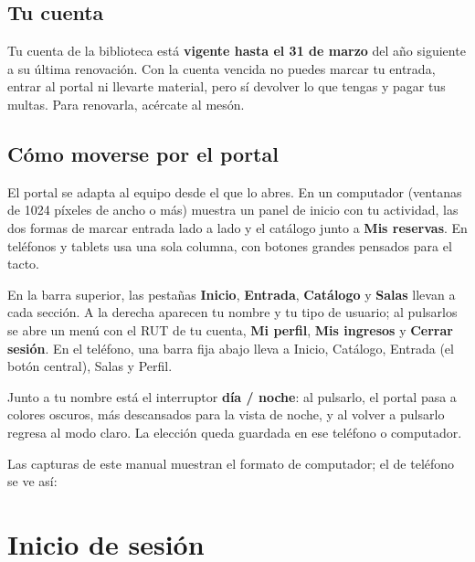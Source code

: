 \documentclass[11pt,a4paper]{report}
\begin{document}
\section{Tu cuenta}

Tu cuenta de la biblioteca está \textbf{vigente hasta el 31 de marzo} del
año siguiente a su última renovación. Con la cuenta vencida no puedes
marcar tu entrada, entrar al portal ni llevarte material, pero sí devolver
lo que tengas y pagar tus multas. Para renovarla, acércate al mesón.

\section{Cómo moverse por el portal}

El portal se adapta al equipo desde el que lo abres. En un computador
(ventanas de 1024 píxeles de ancho o más) muestra un panel de inicio con tu
actividad, las dos formas de marcar entrada lado a lado y el catálogo junto
a \textbf{Mis reservas}. En teléfonos y tablets usa una sola columna, con
botones grandes pensados para el tacto.

En la barra superior, las pestañas \textbf{Inicio}, \textbf{Entrada},
\textbf{Catálogo} y \textbf{Salas} llevan a cada sección. A la derecha
aparecen tu nombre y tu tipo de usuario; al pulsarlos se abre un menú con
el RUT de tu cuenta, \textbf{Mi perfil}, \textbf{Mis ingresos} y
\textbf{Cerrar sesión}. En el teléfono, una barra fija abajo lleva a
Inicio, Catálogo, Entrada (el botón central), Salas y Perfil.

Junto a tu nombre está el interruptor \textbf{día / noche}: al pulsarlo, el
portal pasa a colores oscuros, más descansados para la vista de noche, y al
volver a pulsarlo regresa al modo claro. La elección queda guardada en ese
teléfono o computador.

Las capturas de este manual muestran el formato de computador; el de
teléfono se ve así:


\chapter{Inicio de sesión}
\label{cap:login}
\end{document}
